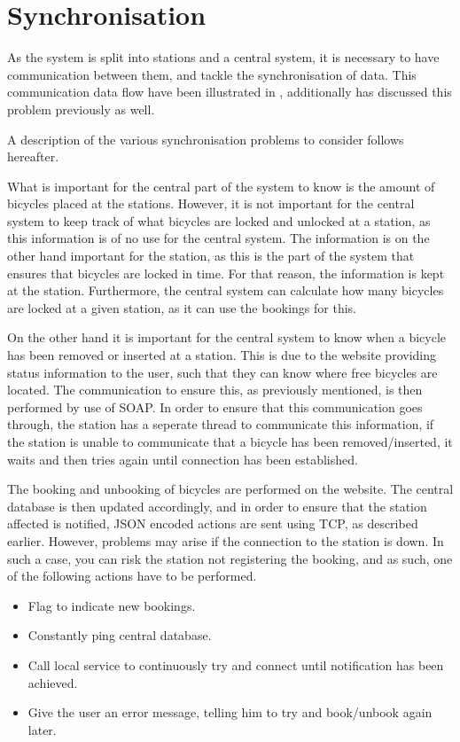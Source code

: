 \section{Synchronisation}\label{sec:implsync}
As the system is split into stations and a central system, it is necessary to have communication between them, and tackle the synchronisation of data.
This communication data flow have been illustrated in , additionally  has discussed this problem previously as well.

A description of the various synchronisation problems to consider follows hereafter.
\begin{description}[style=nextline]
	\item[Bicycle locking/unlocking not synchronised]
	What is important for the central part of the system to know is the amount of bicycles placed at the stations.
	However, it is not important for the central system to keep track of what bicycles are locked and unlocked at a station, as this information is of no use for the central system.
	The information is on the other hand important for the station, as this is the part of the system that ensures that bicycles are locked in time.
	For that reason, the information is kept at the station. Furthermore, the central system can calculate how many bicycles are locked at a given station, as it can use the bookings for this.
	
	\item[Removal/Insertion of bicycles]
	On the other hand it is important for the central system to know when a bicycle has been removed or inserted at a station.
	This is due to the website providing status information to the user, such that they can know where free bicycles are located.
	The communication to ensure this, as previously mentioned, is then performed by use of SOAP.
	In order to ensure that this communication goes through, the station has a seperate thread to communicate this information, if the station is unable to communicate that a bicycle has been removed/inserted, it waits and then tries again until connection has been established.
	
	\item[Booking/Unbooking]
	The booking and unbooking of bicycles are performed on the website. 
	The central database is then updated accordingly, and in order to ensure that the station affected is notified, JSON encoded actions are sent using TCP, as described earlier.
	However, problems may arise if the connection to the station is down.
	In such a case, you can risk the station not registering the booking, and as such, one of the following actions have to be performed.
	\begin{itemize}
		\item Flag to indicate new bookings.
		\item Constantly ping central database.
		\item Call local service to continuously try and connect until notification has been achieved.
		\item Give the user an error message, telling him to try and book/unbook again later. 
	\end{itemize}
	

\end{description}
